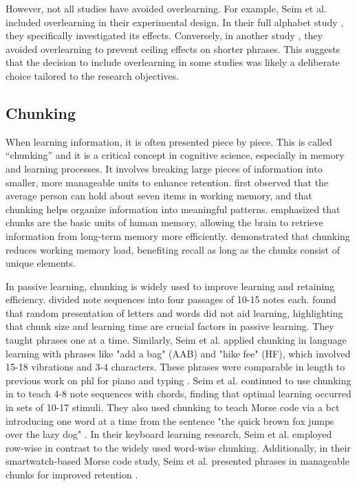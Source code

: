 However, not all studies have avoided overlearning. For example, Seim et al. \cite{Seim2016, Seim2014a} included overlearning in their experimental design. In their full alphabet study \cite{Seim2014a}, they specifically investigated its effects. Conversely, in another study \cite{Seim2015}, they avoided overlearning to prevent ceiling effects on shorter phrases. This suggests that the decision to include overlearning in some studies was likely a deliberate choice tailored to the research objectives.

\subsection*{Chunking}
When learning information, it is often presented piece by piece. This is called \enquote{chunking} and it is a critical concept in cognitive science, especially in memory and learning processes. It involves breaking large pieces of information into smaller, more manageable units to enhance retention.  first observed that the average person can hold about seven items in working memory, and that chunking helps organize information into meaningful patterns.  emphasized that chunks are the basic units of human memory, allowing the brain to retrieve information from long-term memory more efficiently.  demonstrated that chunking reduces working memory load, benefiting recall as long as the chunks consist of unique elements.

In passive learning, chunking is widely used to improve learning and retaining efficiency.  divided note sequences into four passages of 10-15 notes each.  found that random presentation of letters and words did not aid learning, highlighting that chunk size and learning time are crucial factors in passive learning. They taught phrases one at a time. Similarly, Seim et al. \cite{Seim2014a} applied chunking in language learning with phrases like "add a bag" (AAB) and "hike fee" (HF), which involved 15-18 vibrations and 3-4 characters. These phrases were comparable in length to previous work on \gls{phl} for piano \cite{Kohlsdorf2010} and typing \cite{Seim2014}.
Seim et al. continued to use chunking in \cite{Seim2015} to teach 4-8 note sequences with chords, finding that optimal learning occurred in sets of 10-17 stimuli. They also used chunking to teach Morse code via a \gls{bct} introducing one word at a time from the sentence "the quick brown fox jumps over the lazy dog" \cite{Seim2016}.
In their keyboard learning research, Seim et al. \cite{Seim2017} employed row-wise in contrast to the widely used word-wise chunking. Additionally, in their smartwatch-based Morse code study, Seim et al. presented phrases in manageable chunks for improved retention \cite{Seim2018}.

